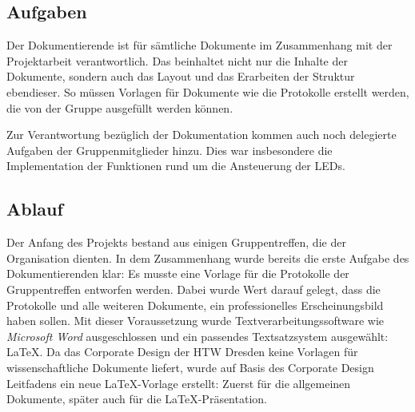 \subsection{Aufgaben}
Der Dokumentierende ist für sämtliche Dokumente im Zusammenhang mit der Projektarbeit verantwortlich. Das beinhaltet nicht nur die Inhalte der Dokumente, sondern auch das Layout und das Erarbeiten der Struktur ebendieser. So müssen Vorlagen für Dokumente wie die Protokolle erstellt werden, die von der Gruppe ausgefüllt werden können.

Zur Verantwortung bezüglich der Dokumentation kommen auch noch delegierte Aufgaben der Gruppenmitglieder hinzu. Dies war insbesondere die Implementation der Funktionen rund um die Ansteuerung der LEDs.
\subsection{Ablauf}

Der Anfang des Projekts bestand aus einigen Gruppentreffen, die der Organisation dienten. In dem Zusammenhang wurde bereits die erste Aufgabe des Dokumentierenden klar: Es musste eine Vorlage für die Protokolle der Gruppentreffen entworfen werden. Dabei wurde Wert darauf gelegt, dass die Protokolle und alle weiteren Dokumente, ein professionelles Erscheinungsbild haben sollen. Mit dieser Voraussetzung wurde Textverarbeitungssoftware wie \emph{Microsoft Word} ausgeschlossen und ein passendes Textsatzsystem ausgewählt: LaTeX. Da das Corporate Design der HTW Dresden keine Vorlagen für wissenschaftliche Dokumente liefert, wurde auf Basis des Corporate Design Leitfadens ein neue LaTeX-Vorlage erstellt: Zuerst für die allgemeinen Dokumente, später auch für die LaTeX-Präsentation.

